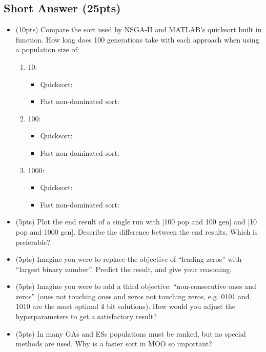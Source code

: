 \documentclass{article}
\begin{document}
\subsection{Short Answer (25pts)}
\begin{itemize}
	\item (10pts) Compare the sort used by NSGA-II and MATLAB's quicksort built in  function. How long does 100 generations take with each approach when using a population size of:
	\begin{enumerate}
		\item 10:
			\begin{itemize}
			\item Quicksort:
			\item Fast non-dominated sort:
			\end{itemize}
		\item 100:
			\begin{itemize}
			\item Quicksort:
			\item Fast non-dominated sort:
			\end{itemize}
		\item 1000:
			\begin{itemize}
			\item Quicksort:
			\item Fast non-dominated sort:
			\end{itemize}
	\end{enumerate}
	\item (5pts) Plot the end result of a single run with [100 pop and 100 gen] and [10 pop and 1000 gen]. Describe the difference between the end results. Which is preferable?
	\item (5pts) Imagine you were to replace the objective of ``leading zeros'' with ``largest binary number''. Predict the result, and give your reasoning.
	\item (5pts) Imagine you were to add a third objective: ``non-consecutive ones and zeros'' (ones not touching ones and zeros not touching zeros, e.g. 0101 and 1010 are the most optimal 4 bit solutions). How would you adjust the hyperparameters to get a satisfactory result?
	\item (5pts) In many GAs and ESs populations must be ranked, but no special methods are used. Why is a faster sort in MOO so important?
\end{itemize}

\newpage
\end{document}
